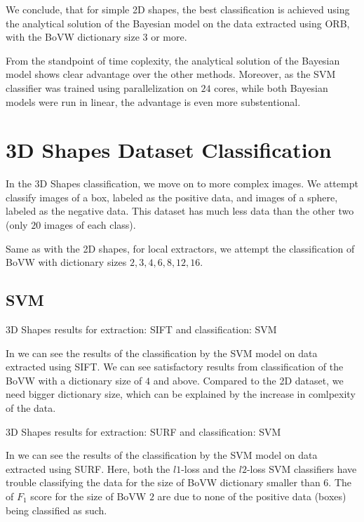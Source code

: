 We conclude, that for simple 2D shapes, the best classification is achieved using the analytical solution of the Bayesian model on the data extracted using ORB, with the BoVW dictionary size $3$ or more.

From the standpoint of time coplexity, the analytical solution of the Bayesian model shows clear advantage over the other methods. Moreover, as the SVM classifier was trained using parallelization on $24$ cores, while both Bayesian models were run in linear, the advantage is even more substentional.

\section{3D Shapes Dataset Classification}
In the 3D Shapes classification, we move on to more complex images. We attempt classify images of a box, labeled as the positive data, and images of a sphere, labeled as the negative data. This dataset has much less data than the other two (only $20$ images of each class).

Same as with the 2D shapes, for local extractors, we attempt the classification of BoVW with dictionary sizes $2, 3, 4, 6, 8, 12, 16$.

\subsection{SVM}
\begin{table}[ht!]
    \centering
    
    \caption{3D Shapes results for extraction: SIFT and classification: SVM}
    \label{tab:3d_SIFT_SVM}
\end{table}
In  we can see the results of the classification by the SVM model on data extracted using SIFT. We can see satisfactory results from classification of the BoVW with a dictionary size of $4$ and above. Compared to the 2D dataset, we need bigger dictionary size, which can be explained by the increase in comlpexity of the data.

\begin{table}[ht!]
    \centering
    
    \caption{3D Shapes results for extraction: SURF and classification: SVM}
    \label{tab:3d_SURF_SVM}
\end{table}
In  we can see the results of the classification by the SVM model on data extracted using SURF. Here, both the $l1$-loss and the $l2$-loss SVM classifiers have trouble classifying the data for the size of BoVW dictionary smaller than $6$. The  of $F_1$ score for the size of BoVW $2$ are due to none of the positive data (boxes) being classified as such.

